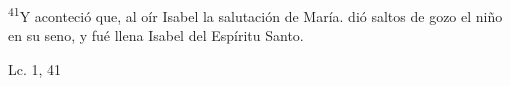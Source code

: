 \documentclass[../../rosario.tex]{subfiles}
\begin{document}
    \textsuperscript{41}Y aconteció que, al oír Isabel la salutación de María. dió saltos de gozo el niño en su seno, y fué llena Isabel del Espíritu Santo.
    \begin{flushright}
    Lc. 1, 41        
    \end{flushright}
\end{document}
